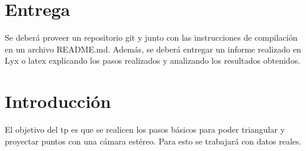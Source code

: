\documentclass[tp]{lcc}
\begin{document}
\maketitle

\section{Entrega}
Se deberá proveer un repositorio git y junto con las instrucciones de compilación en un archivo README.md.
Además, se deberá entregar un informe realizado en Lyx o latex explicando los pasos realizados y analizando los resultados obtenidos.

\section{Introducción}

El objetivo del tp es que se realicen los pasos básicos para poder triangular y proyectar puntos con una cámara estéreo. 
Para esto se trabajará con datos reales.
\end{document}
